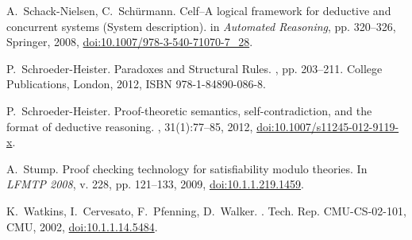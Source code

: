 \documentclass[submission,copyright,creativecommons]{eptcs}
\theoremstyle{plain}
\theoremstyle{definition}
\begin{document}
{\begin{thebibliography}{10}
\begin{scriptsize}
 A.~Schack-Nielsen, C.~Sch{\"u}rmann.  \newblock Celf--A
  logical framework for deductive and concurrent systems (System
  description).  \newblock in {\em Automated Reasoning}, pp. 320--326,
  Springer, 2008, \url{doi:10.1007/978-3-540-71070-7\_28}.

 P.~Schroeder-Heister.  \newblock
  {Paradoxes and Structural Rules}.  , pp.
  203--211. College Publications, London, 2012, ISBN
  978-1-84890-086-8.

 P.~Schroeder-Heister.  \newblock
  Proof-theoretic semantics, self-contradiction, and the format of
  deductive reasoning.  , 31(1):77--85, 2012,
  \url{doi:10.1007/s11245-012-9119-x}.

A.~Stump.
\newblock Proof checking technology for satisfiability modulo
theories.  \newblock In {\em LFMTP 2008}, v. 228, pp. 121--133, 2009, \url{doi:10.1.1.219.1459}.

 K.~Watkins, I.~Cervesato, F.~Pfenning, D.~Walker.
  .  \newblock Tech. Rep. CMU-CS-02-101, CMU, 2002,
  \url{doi:10.1.1.14.5484}.

\end{scriptsize}

\end{thebibliography}

}
\end{document}
